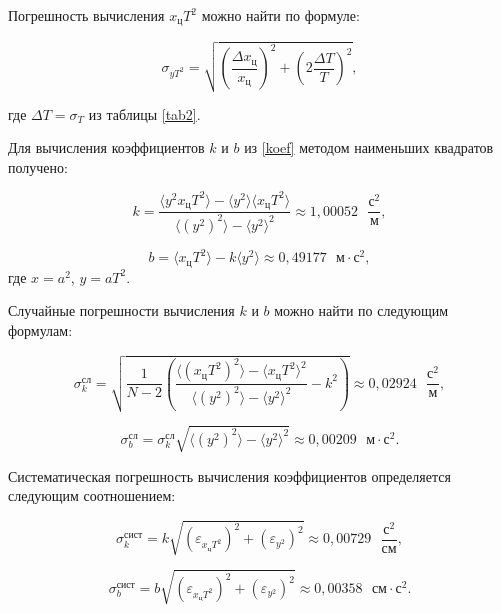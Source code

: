 \documentclass[a4paper,12pt]{article} %
\begin{document}
Погрешность вычисления $ x_\text{ц}T^2 $ можно найти по формуле:

\begin{equation}
\sigma_{yT^2} = \sqrt{\left(  \frac{\Delta x_\text{ц}}{x_\text{ц}} \right)^2 + \left( 2\frac{\Delta T}{T} \right)^2 },
\end{equation}

где $ \Delta T = \sigma_T $ из таблицы \ref{tab2}.

Для вычисления коэффициентов $ k $ и $ b $ из \eqref{koef} методом наименьших квадратов получено:

\begin{equation}
k=\frac{\langle y^2x_\text{ц}T^2\rangle-\langle y^2\rangle \langle x_\text{ц}T^2\rangle}{\langle (y^2)^2\rangle - \langle y^2\rangle^2}\approx 1,00052\text{ }\frac{\text{с}^2}{\text{м}},
\end{equation}

\begin{equation}
b=\langle x_\text{ц}T^2 \rangle -k\langle y^2 \rangle\approx 0,49177\text{ }\text{м}\cdot\text{с}^2,
\end{equation}
где $ x=a^2 $, $ y=aT^2 $.

Случайные погрешности вычисления $ k $ и $ b $ можно найти по следующим формулам:

\begin{equation}
\sigma_k^\text{сл}=\sqrt{\frac{1}{N-2}\left(\frac{\langle (x_\text{ц}T^2)^2 \rangle - \langle x_\text{ц}T^2 \rangle^2}{\langle (y^2)^2 \rangle - \langle y^2 \rangle^2} - k^2 \right) } \approx 0,02924 \text{ }\frac{\text{с}^2}{\text{м}},
\end{equation}

\begin{equation}
\sigma_b^\text{сл}= \sigma_k^\text{сл} \sqrt{\langle (y^2)^2 \rangle - \langle y^2 \rangle^2} \approx 0,00209 \text{ }\text{м}\cdot\text{с}^2.
\end{equation}

Систематическая погрешность вычисления коэффициентов определяется следующим соотношением:

\begin{equation}
\sigma^\text{сист}_k = k\sqrt{\left( \varepsilon_{x_\text{ц}T^2} \right)^2 + \left( \varepsilon_{y^2} \right)^2 } \approx 0,00729 \text{ }\frac{\text{с}^2}{\text{см}},
\end{equation}

\begin{equation}
\sigma^\text{сист}_b = b\sqrt{\left( \varepsilon_{x_\text{ц}T^2} \right)^2 + \left( \varepsilon_{y^2} \right)^2 } \approx  0,00358 \text{ }\text{см}\cdot\text{с}^2.
\end{equation}
\end{document}
